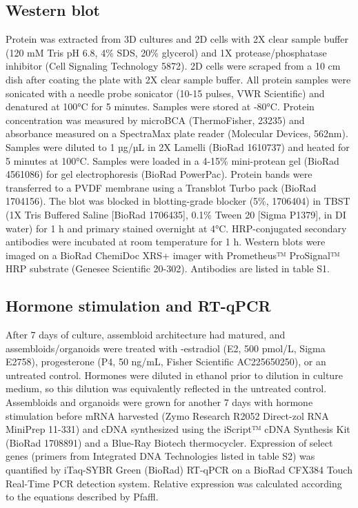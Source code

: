 \begin{refsection}
    \subsection{Western blot}
    Protein was extracted from 3D cultures and 2D cells with 2X clear sample buffer (120 mM Tris pH 6.8, 4\% SDS, 20\% glycerol) and 1X protease/phosphatase inhibitor (Cell Signaling Technology 5872). 2D cells were scraped from a 10 cm dish after coating the plate with 2X clear sample buffer. All protein samples were sonicated with a needle probe sonicator (10-15 pulses, VWR Scientific) and denatured at 100°C for 5 minutes. Samples were stored at -80°C. Protein concentration was measured by microBCA (ThermoFisher, 23235) and absorbance measured on a SpectraMax plate reader (Molecular Devices, 562nm). Samples were diluted to 1 µg/µL in 2X Lamelli (BioRad 1610737) and heated for 5 minutes at 100°C. Samples were loaded in a 4-15\% mini-protean gel (BioRad 4561086) for gel electrophoresis (BioRad PowerPac). Protein bands were transferred to a PVDF membrane using a Transblot Turbo pack (BioRad 1704156). The blot was blocked in blotting-grade blocker (5\%, 1706404) in TBST (1X Tris Buffered Saline [BioRad 1706435], 0.1\% Tween 20 [Sigma P1379], in DI water) for 1 h and primary stained overnight at 4°C. HRP-conjugated secondary antibodies were incubated at room temperature for 1 h. Western blots were imaged on a BioRad ChemiDoc XRS+ imager with Prometheus™ ProSignal™ HRP substrate (Genesee Scientific 20-302). Antibodies are listed in table S1. 
    \subsection{Hormone stimulation and RT-qPCR}
    After 7 days of culture, assembloid architecture had matured, and assembloids/organoids were treated with \textbeta-estradiol (E2, 500 pmol/L, Sigma E2758), progesterone (P4, 50 ng/mL, Fisher Scientific AC225650250)\cite{kessler2015a}, or an untreated control. Hormones were diluted in ethanol prior to dilution in culture medium, so this dilution was equivalently reflected in the untreated control. Assembloids and organoids were grown for another 7 days with hormone stimulation before mRNA harvested (Zymo Research R2052 Direct-zol RNA MiniPrep 11-331) and cDNA synthesized using the iScript™ cDNA Synthesis Kit (BioRad 1708891) and a Blue-Ray Biotech thermocycler. Expression of select genes (primers from Integrated DNA Technologies listed in table S2)\cite{kessler2015a,xie2018a,ma2022a,rajurkar2017a,liu2020a} was quantified by iTaq-SYBR Green (BioRad) RT-qPCR on a BioRad CFX384 Touch Real-Time PCR detection system. Relative expression was calculated according to the equations described by Pfaffl\cite{pfaffl2001a}.


\end{refsection}
